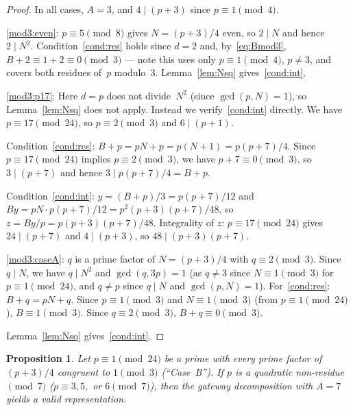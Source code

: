 \documentclass[12pt]{amsart}
\newtheorem{proposition}[theorem]{Proposition}
\theoremstyle{definition}
\theoremstyle{remark}
\begin{document}
\begin{proof}
In all cases, $A = 3$, and $4 \mid (p+3)$ since $p \equiv 1 \pmod 4$.

\ref{mod3:even}: $p \equiv 5 \pmod{8}$ gives $N = (p+3)/4$ even,
so $2 \mid N$ and hence $2 \mid N^2$.
Condition~\ref{cond:res} holds since $d = 2$ and, by~\eqref{eq:Bmod3},
$B + 2 \equiv 1 + 2 \equiv 0 \pmod 3$ --- note this uses only
$p \equiv 1 \pmod 4$, $p \neq 3$, and covers both residues of~$p$
modulo~$3$.
Lemma~\ref{lem:Nsq} gives~\ref{cond:int}.

\ref{mod3:p17}: Here $d = p$ does not divide~$N^2$ (since $\gcd(p, N) = 1$),
so Lemma~\ref{lem:Nsq} does not apply. Instead we verify~\ref{cond:int} directly.
We have $p \equiv 17 \pmod{24}$, so $p \equiv 2 \pmod 3$ and $6 \mid (p+1)$.

Condition~\ref{cond:res}: $B + p = pN + p = p(N+1) = p(p+7)/4$.
Since $p \equiv 17 \pmod{24}$ implies $p \equiv 2 \pmod 3$, we have
$p + 7 \equiv 0 \pmod 3$, so $3 \mid (p+7)$ and hence $3 \mid p(p+7)/4 = B + p$.~\checkmark

Condition~\ref{cond:int}: $y = (B + p)/3 = p(p+7)/12$ and
$By = pN \cdot p(p+7)/12 = p^2(p+3)(p+7)/48$, so
$z = By/p = p(p+3)(p+7)/48$.
Integrality of $z$: $p \equiv 17 \pmod{24}$ gives $24 \mid (p+7)$
and $4 \mid (p+3)$, so $48 \mid (p+3)(p+7)$.~\checkmark

\ref{mod3:caseA}: $q$ is a prime factor of $N = (p+3)/4$ with $q \equiv 2 \pmod{3}$.
Since $q \mid N$, we have $q \mid N^2$ and $\gcd(q, 3p) = 1$ (as $q \neq 3$
since $N \equiv 1 \pmod 3$ for $p \equiv 1 \pmod{24}$, and $q \neq p$ since $q \mid N$ and $\gcd(p, N) = 1$).
For~\ref{cond:res}: $B + q = pN + q$. Since $p \equiv 1 \pmod 3$
and $N \equiv 1 \pmod 3$ (from $p \equiv 1 \pmod{24}$),
$B \equiv 1 \pmod 3$. Since $q \equiv 2 \pmod 3$, $B + q \equiv 0 \pmod 3$.~\checkmark

Lemma~\ref{lem:Nsq} gives~\ref{cond:int}.
\end{proof}

\begin{proposition}\label{prop:nqr7}
Let $p \equiv 1 \pmod{24}$ be a prime with every prime factor of
$(p+3)/4$ congruent to $1 \pmod{3}$ \textup{(``Case~B'')}.
If $p$ is a quadratic non-residue $\pmod{7}$
\textup{(}$p \equiv 3, 5,$ or $6 \pmod{7}$\textup{)},
then the gateway decomposition with $A = 7$ yields a valid representation.
\end{proposition}
\end{document}
